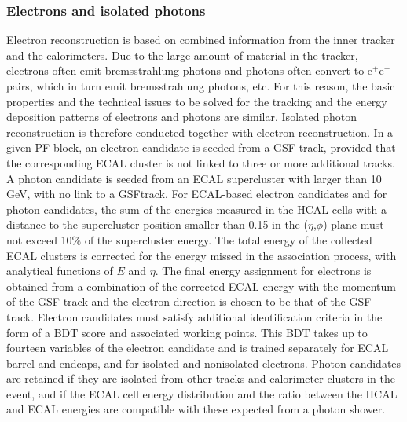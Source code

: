 \subsubsection{Electrons and isolated photons} Electron reconstruction is based on combined information from the inner tracker and the calorimeters. Due to the large amount of material in the tracker, electrons often emit bremsstrahlung photons and photons often convert to e$^+$e$^-$ pairs, which in turn emit bremsstrahlung photons, etc.  For this reason, the basic properties and the technical issues to be solved for the tracking and the energy deposition patterns of electrons and photons are similar. Isolated photon reconstruction is therefore conducted together with electron reconstruction. In a given PF block, an electron candidate is seeded from a GSF track, provided that the corresponding ECAL cluster is not linked to three or more additional tracks. A photon candidate is seeded from an ECAL supercluster with \et larger than 10 GeV, with no link to a GSFtrack. For ECAL-based electron candidates and for photon candidates, the sum of the energies measured in the HCAL cells with a distance to the supercluster position smaller than 0.15 in the ($\eta$,$\phi$) plane must not exceed 10$\%$ of the supercluster energy. The total energy of the collected ECAL clusters is corrected for the energy missed in the association process, with analytical functions of $E$ and $\eta$. The final energy assignment for electrons is obtained from a combination of the corrected ECAL energy with the momentum of the GSF track and the electron direction is chosen to be that of the GSF track. Electron candidates must satisfy additional identification criteria in the form of a BDT score and associated working points. This BDT takes up to fourteen variables of the electron candidate and is trained separately for ECAL barrel and endcaps, and for isolated and nonisolated electrons. Photon candidates are retained if they are isolated from other tracks and calorimeter clusters in the event, and if the ECAL cell energy distribution and the ratio between the HCAL and ECAL energies are compatible with these expected from a photon shower. 

